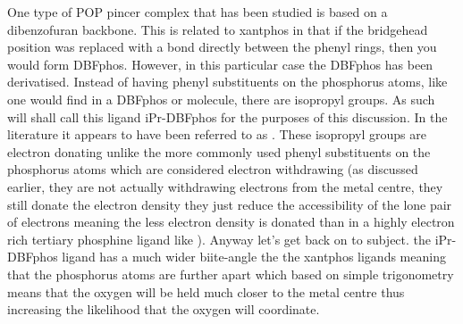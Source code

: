One type of POP pincer complex that has been studied is based on a dibenzofuran backbone.  This is related to xantphos in that if the bridgehead position was replaced with a bond directly between the phenyl rings, then you would form DBFphos.  However, in this particular case the DBFphos has been derivatised.  Instead of having phenyl substituents on the phosphorus atoms, like one would find in a DBFphos or \Phxantphos{} molecule, there are isopropyl groups.  As such will shall call this ligand iPr-DBFphos for the purposes of this discussion.  In the literature it appears to have been referred to as .  These isopropyl groups are electron donating unlike the more commonly used phenyl substituents on the phosphorus atoms which are considered electron withdrawing (as discussed earlier, they are not actually withdrawing electrons from the metal centre, they still donate the electron density they just reduce the accessibility of the lone pair of electrons meaning the less electron density is donated than in a highly electron rich tertiary phosphine ligand like ).  Anyway let's get back on to subject.  the iPr-DBFphos ligand has a much wider biite-angle the the xantphos ligands meaning that the phosphorus atoms are further apart which based on simple trigonometry means that the oxygen will be held much closer to the metal centre thus increasing the likelihood that the oxygen will coordinate. 


